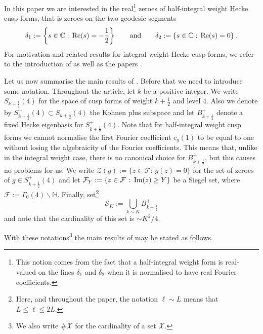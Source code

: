 \documentclass[a4paper,10pt,twoside]{amsart}
\theoremstyle{definition}
\numberwithin{equation}{section}
\renewcommand{\Re}{\textnormal{Re}}
\renewcommand{\Im}{\textnormal{Im}}
\renewcommand\:{\colon}
\begin{document}
In this paper we are interested in the real\footnote{This notion comes from the fact that a half-integral weight form is real-valued on the lines $\delta_1$ and $\delta_2$ when it is normalised to have real Fourier coefficients.} zeroes of half-integral weight Hecke cusp forms, that is zeroes on the two geodesic segments
\[ 
\delta_1:=\left\{s\in\mathbb C:\,\Re(s)=-\frac12\right\} \qquad \text{and} \qquad \delta_2:=\left\{s\in\mathbb C:\,\Re(s)=0\right\}.
\]
\noindent For motivation and related results for integral weight Hecke cusp forms, we refer to the introduction of \cite{Jaasaari2026} as well as the papers \cite{Ghosh-Sarnak2012, Matomaki2016, Lester-Matomaki-Radziwill2018}.

Let us now summarise the main results of \cite{Jaasaari2026}. Before that we need to introduce some notation. Throughout the article, let $k$ be a positive integer. We write $S_{k+\frac12}(4)$ for the space of cusp forms of weight $k+\frac12$ and level $4$. Also we denote by $S_{k+\frac12}^+(4)\subset S_{k+\frac12}(4)$ the Kohnen plus subspace and let $B^+_{k+\frac12}$ denote a fixed Hecke eigenbasis for $S_{k+\frac12}^+(4)$. Note that for half-integral weight cusp forms we cannot normalise the first Fourier coefficient $c_g(1)$ to be equal to one without losing the algebraicity of the Fourier coefficients. This means that, unlike in the integral weight case, there is no canonical choice for $B_{k+\frac12}^+$, but this causes no problems for us. We write $\mathcal Z(g):=\{z\in\mathcal F:\,g(z)=0\}$ for the set of zeroes of $g\in S_{k+\frac12}^+(4)$ and let $\mathcal F_Y:=\{z\in\mathcal F\,:\,\Im(z)\geq Y\}$ be a Siegel set, where $\mathcal F:=\Gamma_0(4)\backslash\mathbb H$. Finally, set\footnote{Here, and throughout the paper, the notation $\ell\sim L$ means that $L\leq \ell\leq 2L$.}
\[\mathcal S_K:=\bigcup_{k\sim K}B_{k+\frac12}^+\]
and note that the cardinality of this set is $\sim K^2/4$.

With these notations\footnote{We also write $\#\mathcal X$ for the cardinality of a set $\mathcal X$.} the main results of \cite{Jaasaari2026} may be stated as follows. 
\end{document}
